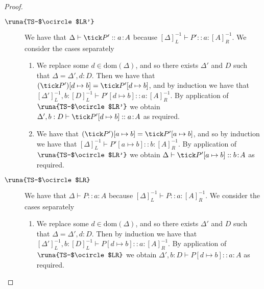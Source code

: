 \begin{lemma}
\begin{proof}
\begin{description}

\item[$\runa{TS-$\ocircle$LR'}$] We have that $\Delta\vdash \tick P' :: a\!:\!A$ because $[\Delta]^{-1}_L\vdash P' :: a\!:\![A]^{-1}_R$. We consider the cases separately
\begin{enumerate}
    \item We replace some $d\in\text{dom}(\Delta)$, and so there exists $\Delta'$ and $D$ such that $\Delta=\Delta',d:D$. Then we have that $(\tick P')[d\mapsto b]=\tick P'[d\mapsto b]$, and by induction we have that $[\Delta']^{-1}_L,b:[D]^{-1}_L\vdash P'[d\mapsto b] :: a\!:\![A]^{-1}_R$. By application of $\runa{TS-$\ocircle$LR'}$ we obtain $\Delta',b:D\vdash \tick P'[d\mapsto b] :: a\!:\!A$ as required.
    
    \item We have that $(\tick P')[a\mapsto b]=\tick P'[a\mapsto b]$, and so by induction we have that $[\Delta]^{-1}_L\vdash P'[a\mapsto b] :: b\!:\![A]^{-1}_R$. By application of $\runa{TS-$\ocircle$LR'}$ we obtain $\Delta\vdash \tick P'[a\mapsto b] :: b\!:\!A$ as required.
\end{enumerate}


\item[$\runa{TS-$\ocircle$LR}$] We have that $\Delta\vdash P :: a\!:\!A$ because $[\Delta]^{-1}_L\vdash P :: a\!:\![A]^{-1}_R$. We consider the cases separately
\begin{enumerate}
    \item We replace some $d\in\text{dom}(\Delta)$, and so there exists $\Delta'$ and $D$ such that $\Delta=\Delta',d:D$. Then by induction we have that $[\Delta']^{-1}_L,b:[D]^{-1}_L\vdash P[d\mapsto b] :: a\!:\![A]^{-1}_R$. By application of $\runa{TS-$\ocircle$LR}$ we obtain $\Delta',b:D\vdash P[d\mapsto b] :: a\!:\!A$ as required.
    

\end{enumerate}
\end{description}
\end{proof}
\end{lemma}
